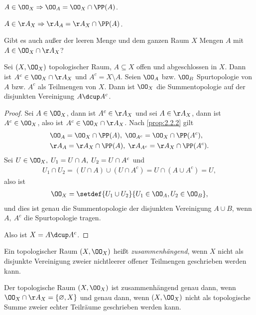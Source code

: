 \begin{prop}
\label{prop:2.2.2}
$A\in\OO_X \Rightarrow \OO_A = \OO_X\cap \PP(A)$.

$A\in\AA_X \Rightarrow \AA_A = \AA_X \cap \PP(A)$.\fishhere
\end{prop}

Gibt es auch außer der leeren Menge und dem ganzen Raum $X$ Mengen $A$ mit
$A\in \OO_X\cap \AA_X$?


\begin{prop}
\label{prop:2.2.3}
Sei $(X,\OO_X)$ topologischer Raum, $A\subseteq X$ offen und abgeschlossen in
$X$. Dann ist $A^c\in\OO_X\cap\AA_X$ und $A^c=X\setminus A$. Seien $\OO_A$ bzw.
$\OO_B$ Spurtopologie von $A$ bzw. $A^c$ als Teilmengen von $X$. Dann ist $\OO_X$
die Summentopologie auf der disjunkten Vereinigung $A\dcup A^c$.\fishhere
\end{prop}

\begin{proof}
Sei $A\in\OO_X$, dann ist $A^c\in\AA_X$ und sei $A\in\AA_X$, dann ist
$A^c\in\OO_X$, also ist $A^c\in\OO_X\cap\AA_X$. Nach \ref{prop:2.2.2} gilt
\begin{align*}
&\OO_A = \OO_X\cap \PP(A),\;\OO_{A^c} = \OO_X\cap \PP(A^c),\\
&\AA_A = \AA_X \cap \PP(A),\;\AA_{A^c} = \AA_X \cap \PP(A^c).
\end{align*}
Sei $U\in\OO_X,\;U_1=U\cap A,\;U_2=U\cap A^c$ und
\begin{align*}
U_1\cap U_2 = (U\cap A)\cup(U\cap A^c) = U\cap(A\cup A^c) = U,
\end{align*}
also ist
\begin{align*}
\OO_X = \setdef{U_1\cup U_2}{U_1\in\OO_A,U_2\in\OO_B},
\end{align*}
und dies ist genau die Summentopologie der disjunkten Vereinigung $A\cup B$,
wenn $A,\ A^c$ die Spurtopologie tragen.

Also ist $X=A\dcup A^c$.\qedhere
\end{proof}

\begin{defn}
\label{defn:2.2.4}
Ein topologischer Raum $(X,\OO_X)$ heißt \emph{zusammenhängend}, wenn $X$ nicht
als disjunkte Vereinigung zweier nichtleerer offener Teilmengen geschrieben werden
kann.\fishhere
\end{defn}

\begin{bem}
\label{bem:2.2.5}
Der topologische Raum $(X,\OO_X)$ ist zusammenhängend genau dann, wenn
$\OO_X\cap\AA_X = \{\varnothing,X\}$ und genau dann, wenn $(X,\OO_X)$ nicht als
topologische Summe zweier echter Teilräume geschrieben werden kann.\maphere
\end{bem}

